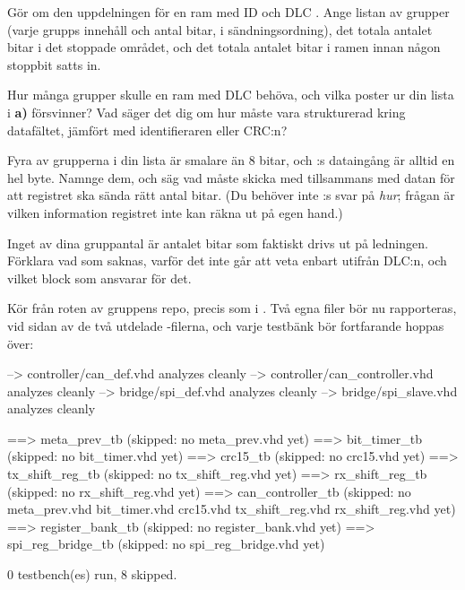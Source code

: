  Gör om den uppdelningen för en ram med ID  och DLC . Ange listan av
grupper (varje grupps innehåll och antal bitar, i sändningsordning), det totala antalet bitar i det
stoppade området, och det totala antalet bitar i ramen innan någon stoppbit satts in.

 Hur många grupper skulle en ram med DLC  behöva, och vilka poster ur din lista i
\textbf{a)} försvinner? Vad säger det dig om hur  måste vara strukturerad kring
datafältet, jämfört med identifieraren eller CRC:n?

 Fyra av grupperna i din lista är smalare än 8 bitar, och :s dataingång
är alltid en hel byte. Namnge dem, och säg vad  måste skicka med tillsammans med
datan för att registret ska sända rätt antal bitar. (Du behöver inte :s svar på
\emph{hur}; frågan är vilken information registret inte kan räkna ut på egen hand.)

 Inget av dina gruppantal är antalet bitar som faktiskt drivs ut på ledningen. Förklara vad
som saknas, varför det inte går att veta enbart utifrån DLC:n, och vilket block som ansvarar för det.


\label{c11:ex:entity}
 Kör  från roten av gruppens repo, precis som i .
Två egna filer bör nu rapporteras, vid sidan av de två utdelade -filerna, och varje
testbänk bör fortfarande hoppas över:

\begin{console}
--> controller/can_def.vhd analyzes cleanly
--> controller/can_controller.vhd analyzes cleanly
--> bridge/spi_def.vhd analyzes cleanly
--> bridge/spi_slave.vhd analyzes cleanly

==> meta_prev_tb (skipped: no meta_prev.vhd yet)
==> bit_timer_tb (skipped: no bit_timer.vhd yet)
==> crc15_tb (skipped: no crc15.vhd yet)
==> tx_shift_reg_tb (skipped: no tx_shift_reg.vhd yet)
==> rx_shift_reg_tb (skipped: no rx_shift_reg.vhd yet)
==> can_controller_tb (skipped: no meta_prev.vhd bit_timer.vhd crc15.vhd tx_shift_reg.vhd rx_shift_reg.vhd yet)
==> register_bank_tb (skipped: no register_bank.vhd yet)
==> spi_reg_bridge_tb (skipped: no spi_reg_bridge.vhd yet)

0 testbench(es) run, 8 skipped.
\end{console}


